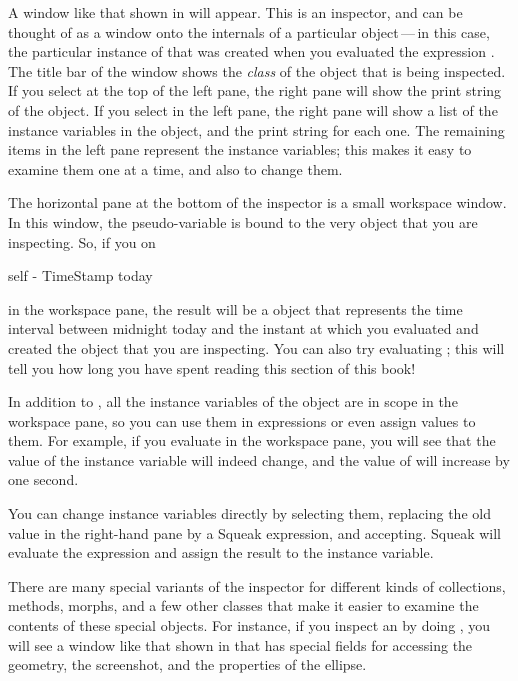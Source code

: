 \documentclass[a4paper,10pt,twoside]{book}
\begin{document}
A window like that shown in  will appear.
This is an inspector, and can be thought of as a window onto the internals of a particular object\,---\,in this case, the particular instance of  that was created when you evaluated the expression .
The title bar of the window shows the \emph{class} of the object that is being inspected.
If you select  at the top of the left pane, the right pane will show the print string of the object.
If you select  in the left pane, the right pane will show a list of the instance variables in the object, and the print string for each one.
The remaining items in the left pane represent the instance variables; this makes it easy to examine them one at a time, and also to change them.

The horizontal pane at the bottom of the inspector is a small workspace window.
In this window, the pseudo-variable  is bound to the very object that you are inspecting.
So, if you  on
\begin{code}{}
self - TimeStamp today
\end{code}
in the workspace pane, the result will be a  object that represents the time interval between midnight today and the instant at which you evaluated  and created the  object that you are inspecting.
You can also try evaluating ; this will tell you how long you have spent reading this section of this book!

In addition to , all the instance variables of the object are in scope in the workspace pane, so you can use them in expressions or even assign values to them.
For example, if you evaluate  in the workspace pane, you will see that the value of the  instance variable will indeed change, and the value of  will increase by one second.

You can change instance variables directly by selecting them, replacing the old value in the right-hand pane by a Squeak expression, and accepting.
Squeak will evaluate the expression and assign the result to the instance variable.

There are many special variants of the inspector for different kinds of collections, methods, morphs, and a few other classes that make it easier to examine the contents of these special objects.
For instance, if you inspect an  by doing , you will see a window like that shown in  that has special fields for accessing the geometry, the screenshot, and the properties of the ellipse.
\end{document}
